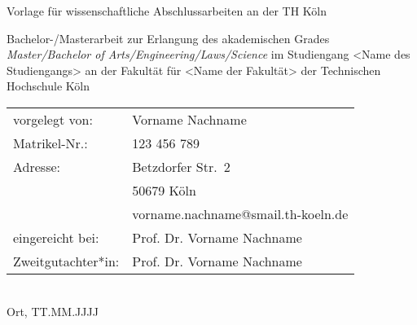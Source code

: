 \begin{titlepage}
%
\sffamily%
%
\begin{center}
\end{center}
%
\vfill
%
\begin{huge}
Vorlage für wissenschaftliche Abschlussarbeiten an der TH Köln\\[10mm]
\end{huge}
%
Bachelor-/Masterarbeit zur Erlangung des akademischen Grades\newline
\emph{Master/Bachelor of Arts/Engineering/Laws/Science}\newline
im Studiengang <Name des Studiengangs>\newline
an der Fakultät für <Name der Fakultät>\newline
der Technischen Hochschule Köln
%
\vfill
%
\begin{tabular}{@{}ll}
vorgelegt von: & Vorname Nachname\\
Matrikel-Nr.:  & 123 456 789\\
Adresse:       & Betzdorfer Str.~2\\
               & 50679 Köln\\
               & vorname.nachname@smail.th-koeln.de\\[5mm]
eingereicht bei:   & Prof. Dr. Vorname Nachname\\
Zweitgutachter*in: & Prof. Dr. Vorname Nachname
\end{tabular}	
%
\\[10mm]
%
Ort, TT.MM.JJJJ%
%
\rmfamily%
%
\end{titlepage}